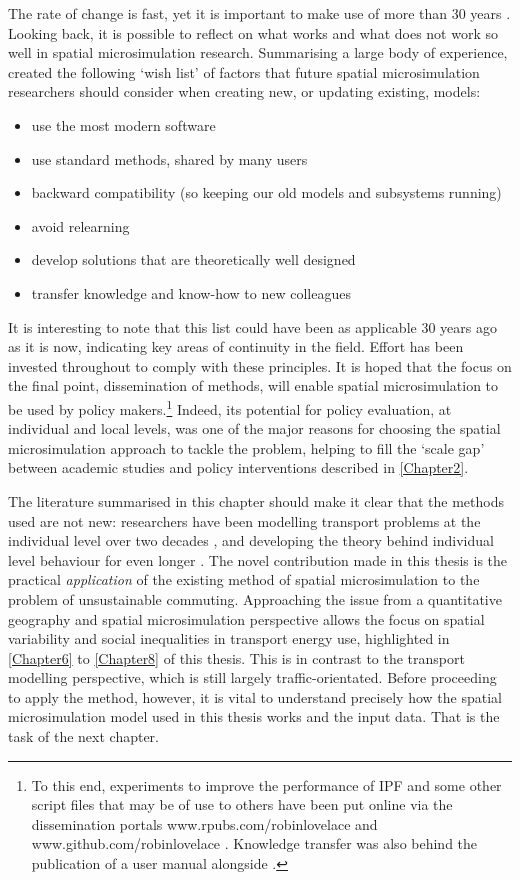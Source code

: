 \documentclass[a4paper, 11pt, twoside]{Thesis}
\begin{document}
The rate of change is fast, yet it is important to make use of more than 30 years
. Looking back, it is possible to reflect
on what works and what does not work so well in spatial microsimulation
research. Summarising a large body of experience,
\citet[p.~197]{Holm2013-design-principles} created the following `wish list' of
factors that future spatial microsimulation researchers should consider
when creating new, or updating existing, models:
\begin{itemize}
\item  use the most modern software
\item  use standard methods, shared by many users
\item  backward compatibility (so keeping our old models and subsystems running)
\item  avoid relearning
\item  develop solutions that are theoretically well designed
\item  transfer knowledge and know-how to new colleagues
\end{itemize}
It is interesting to note that this list could have been as applicable 30 years
ago as it is now, indicating key areas of continuity in the field.
Effort has been invested throughout to comply with these
principles. It is hoped that the focus on the final point, dissemination of methods,
will enable spatial microsimulation to be used by policy
makers.\footnote{To
this end, experiments to improve the performance of IPF and some other
script files that may be of use to others
have been put online via the dissemination portals www.rpubs.com/robinlovelace
and www.github.com/robinlovelace . Knowledge transfer was also behind the
publication of a user manual alongside \citet{Lovelace2013-trs}.
}
Indeed,
its potential for policy evaluation, at individual and local levels, was
one of the major reasons for choosing the spatial microsimulation approach
to tackle the problem, helping to fill the `scale gap' between academic
studies and policy interventions described in \cref{Chapter2}.

The literature summarised in this chapter should make it clear that
the methods used are not new: researchers have been modelling
transport problems at the individual level over two decades \citep{Ortuzar1982},
and developing the theory behind individual level behaviour for even longer
\citep{Wilson1970}.
The novel
contribution made in this thesis is the practical \emph{application} of
the existing method of spatial microsimulation to the problem of unsustainable
commuting. Approaching the issue from a quantitative geography and spatial
microsimulation perspective allows the focus on spatial
variability and social inequalities in transport energy use, highlighted in
\cref{Chapter6} to \cref{Chapter8} of this thesis. This is in contrast to the 
transport modelling perspective, which is still largely traffic-orientated.
Before proceeding to apply
the method, however, it is vital to understand precisely how the
spatial microsimulation model used in this thesis works and the input data.
That is the task of the next chapter.
\end{document}
